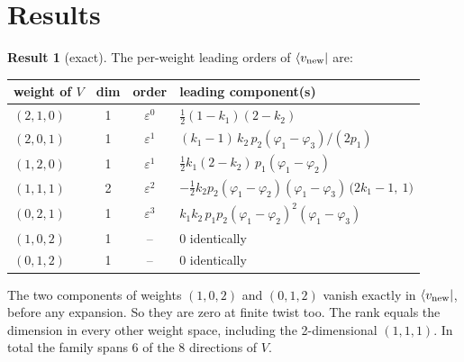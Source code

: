 \documentclass[11pt]{article}
\theoremstyle{definition}
\newtheorem{result}{Result}
\theoremstyle{remark}
\begin{document}
\section{Results}

\begin{result}[exact]\label{res:weights}
The per-weight leading orders of $\langle v_{\rm new}|$ are:
\begin{center}
\begin{tabular}{lccl}\toprule
weight of $V$ & dim & order & leading component(s)\\\midrule
$(2,1,0)$ & 1 & $\varepsilon^0$ & $\tfrac12(1-k_1)(2-k_2)$\\
$(2,0,1)$ & 1 & $\varepsilon^1$ & $(k_1-1)\,k_2\,p_2(\varphi_1-\varphi_3)/(2p_1)$\\
$(1,2,0)$ & 1 & $\varepsilon^1$ & $\tfrac12k_1(2-k_2)\,p_1(\varphi_1-\varphi_2)$\\
$(1,1,1)$ & 2 & $\varepsilon^2$ & $-\tfrac12k_2p_2(\varphi_1-\varphi_2)(\varphi_1-\varphi_3)\,\big(2k_1-1,\ 1\big)$\\
$(0,2,1)$ & 1 & $\varepsilon^3$ & $k_1k_2\,p_1p_2(\varphi_1-\varphi_2)^2(\varphi_1-\varphi_3)$\\
$(1,0,2)$ & 1 & -- & $0$ identically\\
$(0,1,2)$ & 1 & -- & $0$ identically\\\bottomrule
\end{tabular}
\end{center}
The two components of weights $(1,0,2)$ and $(0,1,2)$ vanish exactly in $\langle v_{\rm new}|$, before any expansion. So they are zero at finite twist too. The rank equals the dimension in every other weight space, including the 2-dimensional $(1,1,1)$. In total the family spans 6 of the 8 directions of $V$.
\end{result}
\end{document}
